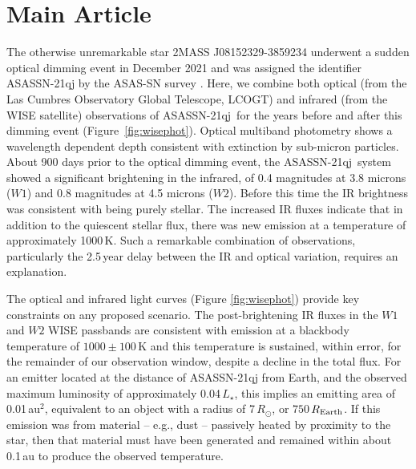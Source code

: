 \documentclass[sn-nature]{sn-jnl}%
\newcommand{\asas}{ASASSN-21qj}
\begin{document}
\section{Main Article}\label{sec1}






The otherwise unremarkable star 2MASS J08152329-3859234 underwent a sudden optical dimming event in December 2021 \cite{RizzoSmith21,RizzoSmith22} and was assigned the identifier \asas{} by the ASAS-SN survey \citep{shappee_man_2014,kochanek_all-sky_2017}.
%
Here, we combine both optical (from the Las Cumbres Observatory Global Telescope, LCOGT) and infrared (from the WISE satellite) observations of \asas~for the years before and after this dimming event (Figure~\ref{fig:wisephot}). 
%
Optical multiband photometry shows a wavelength dependent depth consistent with extinction by sub-micron particles.
%
About 900 days prior to the optical dimming event, the \asas~system showed a significant brightening in the infrared, of 0.4 magnitudes at 3.8 microns ($W1$) and 0.8 magnitudes at 4.5 microns ($W2$).
%
Before this time the IR brightness was consistent with being purely stellar.
%
The increased IR fluxes indicate that in addition to the quiescent stellar flux, there was new emission at a temperature of approximately 1000\,K.
%
Such a remarkable combination of observations, particularly the 2.5\,year delay between the IR and optical variation, requires an explanation.




The optical and infrared light curves (Figure \ref{fig:wisephot}) provide key constraints on any proposed scenario.
%
The post-brightening IR fluxes in the $W1$ and $W2$ WISE passbands are consistent with emission at a blackbody temperature of $1000 \pm 100$\,K and this temperature is sustained, within error, for the remainder of our observation window, despite a decline in the total flux.
%
For an emitter located at the distance of ASASSN-21qj from Earth, and the observed  maximum luminosity of approximately 0.04\,$L_\star$, this implies an emitting area of 0.01\,au$^2$, equivalent to an object with a radius of 7\,$R_\odot$, or $750$\,$R_{\rm Earth}$.
%
If this emission was from material -- e.g., dust -- passively heated by proximity to the star, then that material must have been generated and remained within about 0.1\,au to produce the observed temperature.
\end{document}

